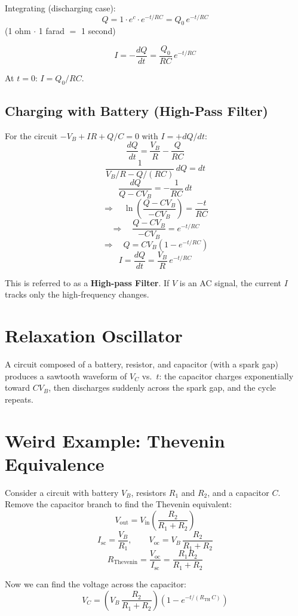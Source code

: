 Integrating (discharging case):
\[
    \boxed{Q = 1\cdot e^{c}\cdot e^{-t/RC} = Q_0\,e^{-t/RC}}
\]
(1 ohm $\cdot$ 1 farad $=$ 1 second)

\[
    I = -\frac{dQ}{dt} = \frac{Q_0}{RC}\,e^{-t/RC}
\]

At $t=0$: $I = Q_0/RC$.

\subsection{Charging with Battery (High-Pass Filter)}

For the circuit $-V_B + IR + Q/C = 0$ with $I = +dQ/dt$:
\[
    \frac{dQ}{dt} = \frac{V_B}{R} - \frac{Q}{RC}
\]
\[
    \frac{1}{V_B/R - Q/(RC)}\,dQ = dt
\]
\[
    \frac{dQ}{Q - CV_B} = -\frac{1}{RC}\,dt
\]
\[
    \Rightarrow\quad \ln\!\left(\frac{Q-CV_B}{-CV_B}\right) = \frac{-t}{RC}
\]
\[
    \Rightarrow\quad \frac{Q - CV_B}{-CV_B} = e^{-t/RC}
\]
\[
    \Rightarrow\quad \boxed{Q = CV_B\!\left(1 - e^{-t/RC}\right)}
\]
\[
    I = \frac{dQ}{dt} = \frac{V_B}{R}\,e^{-t/RC}
\]

This is referred to as a \textbf{High-pass Filter}. If $V$ is an AC signal, the current $I$ tracks only the high-frequency changes.

\section{Relaxation Oscillator}

A circuit composed of a battery, resistor, and capacitor (with a spark gap) produces a sawtooth waveform of $V_C$ vs.\ $t$: the capacitor charges exponentially toward $CV_B$, then discharges suddenly across the spark gap, and the cycle repeats.

\section{Weird Example: Thevenin Equivalence}

\begin{example}
Consider a circuit with battery $V_B$, resistors $R_1$ and $R_2$, and a capacitor $C$. Remove the capacitor branch to find the Thevenin equivalent:
\[
    V_\text{out} = V_\text{in}\!\left(\frac{R_2}{R_1+R_2}\right)
\]
\[
    I_\text{sc} = \frac{V_B}{R_1}, \qquad V_\text{oc} = V_B\,\frac{R_2}{R_1+R_2}
\]
\[
    R_\text{Thevenin} = \frac{V_\text{oc}}{I_\text{sc}} = \boxed{\frac{R_1 R_2}{R_1+R_2}}
\]

Now we can find the voltage across the capacitor:
\[
    V_C = \left(V_B\,\frac{R_2}{R_1+R_2}\right)\!\left(1 - e^{-t/(R_\text{TH}\,C)}\right)
\]
\end{example}

